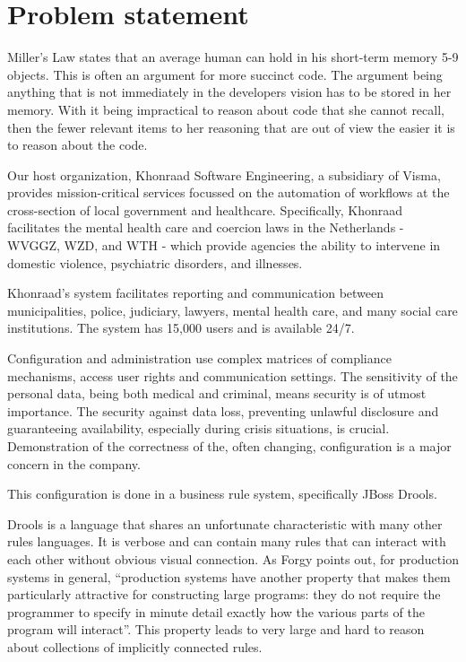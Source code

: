 \section{Problem statement}

Miller's Law\cite{miller1956magical} states that an average human can hold in his short-term memory 5-9 objects.
This is often an argument for more succinct code.  
The argument being anything that is not immediately in the developers vision has to be stored in her memory.
With it being impractical to reason about code that she cannot recall, then the fewer relevant items to her reasoning that are out of view the easier it is to reason about the code.

Our host organization, Khonraad Software Engineering, a subsidiary of Visma, provides mission-critical services focussed on the automation of workflows at the cross-section of local government and healthcare.
Specifically, Khonraad facilitates the mental health care and coercion laws in the Netherlands - WVGGZ, WZD, and WTH - which provide agencies the ability to intervene in domestic violence, psychiatric disorders, and illnesses.

Khonraad's system facilitates reporting and communication between municipalities, police, judiciary, lawyers, mental health care, and many social care institutions.
The system has 15,000 users and is available 24/7. 

Configuration and administration use complex matrices of compliance mechanisms, access user rights and communication settings.
The sensitivity of the personal data, being both medical and criminal, means security is of utmost importance.
The security against data loss, preventing unlawful disclosure and guaranteeing availability, especially during crisis situations, is crucial.
Demonstration of the correctness of the, often changing, configuration is a major concern in the company. 

This configuration is done in a business rule system, specifically JBoss Drools. 

Drools is a language that shares an unfortunate characteristic with many other rules languages. 
It is verbose and can contain many rules that can interact with each other without obvious visual connection.
As Forgy\cite{forgy1989rete} points out, for production systems in general, ``production systems have another property that makes them particularly attractive for constructing large programs: they do not require the programmer to specify in minute detail exactly how the various parts of the program will interact''.
This property leads to very large and hard to reason about collections of implicitly connected rules.

